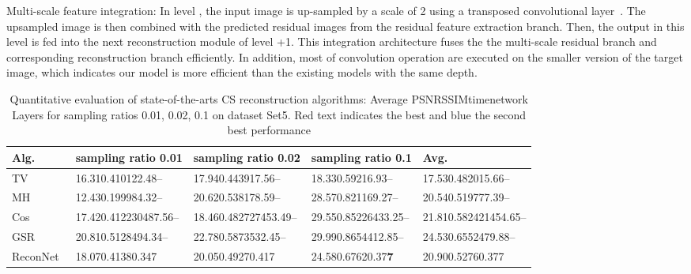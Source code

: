 \documentclass{article}
\begin{document}
 Multi-scale feature integration: In level , the input image is up-sampled by a scale of 2 using a transposed convolutional layer~\cite{dumoulin2016guide}. The upsampled image is then combined with the predicted residual images from the residual feature extraction branch. Then, the output in this level  is fed into the next reconstruction module of level +1. This integration architecture fuses the the multi-scale residual branch and corresponding reconstruction branch efficiently. In addition, most of convolution operation are executed on the smaller version of the target image, which indicates our model is more efficient than the existing models with the same depth.


\begin{table*}[!t]
\centering

    \caption{Quantitative evaluation of state-of-the-arts CS reconstruction algorithms: Average PSNRSSIMtimenetwork Layers for sampling ratios 0.01, 0.02, 0.1 on dataset Set5. {\color{red}Red} text indicates the best and {\color{blue}blue} the second best performance}     \label{tab:results1}
    \renewcommand\arraystretch{1.10}
    \begin{small}
    \begin{tabular}{>{\hfil}p{55pt}<{\hfil}|>{\hfil}p{98pt}<{\hfil}|>{\hfil}p{98pt}<{\hfil}|
    >{\hfil}p{98pt}<{\hfil}|>{\hfil}p{98pt}<{\hfil}}

\hline
{ Alg.} & {  sampling ratio 0.01} & {sampling ratio 0.02} & { sampling ratio 0.1} & {Avg.}      \\
    \hline
    TV~\cite{li1tval3}           & 16.310.410122.48--    & 17.940.443917.56--	& 18.330.59216.93--	&  17.530.482015.66--        \\

MH~\cite{chen2011compressed}             & 12.430.199984.32--	&   20.620.538178.59--  & 28.570.821169.27--	&  20.540.519777.39--        \\

Cos~\cite{zhang2012compressed}            & 17.420.412230487.56-- 	&	18.460.482727453.49--	& 29.550.85226433.25--    &  21.810.582421454.65--     \\

GSR~\cite{zhang2014group}            &  20.810.5128494.34-- 	&	22.780.5873532.45--	& 29.990.8654412.85--	&  24.530.6552479.88--     \\
ReconNet~\cite{kulkarni2016reconnet}         & 18.070.41380.347	&	20.050.49270.417	& 24.580.67620.37\textbf{\color{blue}7}	&  20.900.52760.377     \\


\end{tabular}
\end{small}
\end{table*}
\end{document}
